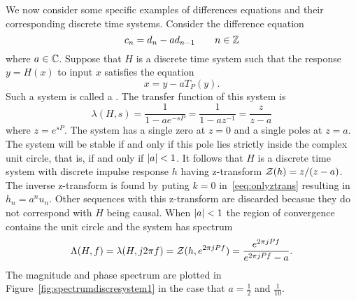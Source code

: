 We now consider some specific examples of differences equations and their corresponding discrete time systems.  Consider the difference equation
\[
c_n = d_n - a d_{n-1} \qquad n \in {\mathbb Z}
\]
where $a \in {\mathbb C}$.  Suppose that $H$ is a discrete time system such that the response $y = H(x)$ to input $x$ satisfies the equation
\[
x = y - a T_{P}(y).
\]
Such a system is called a .  The transfer function of this system is
\[
\lambda(H,s) = \frac{1}{1 - a e^{-sP}} = \frac{1}{1 - a z^{-1}} = \frac{z}{z - a}
\]
where $z = e^{sP}$.  The system has a single zero at $z=0$ and a single poles at $z = a$.  The system will be stable if and only if this pole lies strictly inside the complex unit circle, that is, if and only if $\left\vert a \right\vert < 1$.  It follows that $H$ is a discrete time system with discrete impulse response $h$ having z-transform ${\mathcal Z}(h) = z/(z-a)$.  The inverse z-transform is found by puting $k=0$ in~\eqref{eeq:onlyztrans} resulting in $h_n = a^n u_n$.  Other sequences with this z-transform are discarded becasue they do not correspond with $H$ being causal.  %
When $\left\vert a \right\vert < 1$ the region of convergence contains the unit circle and the system has spectrum
\[
\Lambda(H,f) = \lambda(H,j2\pi f) = {\mathcal Z}(h, e^{2\pi j P f}) = \frac{e^{2\pi j P f}}{e^{2\pi j P f} - a}.
\]
The magnitude and phase spectrum are plotted in Figure~\ref{fig:spectrumdiscresystem1} in the case that $a = \tfrac{1}{2}$ and $\tfrac{1}{10}$.

